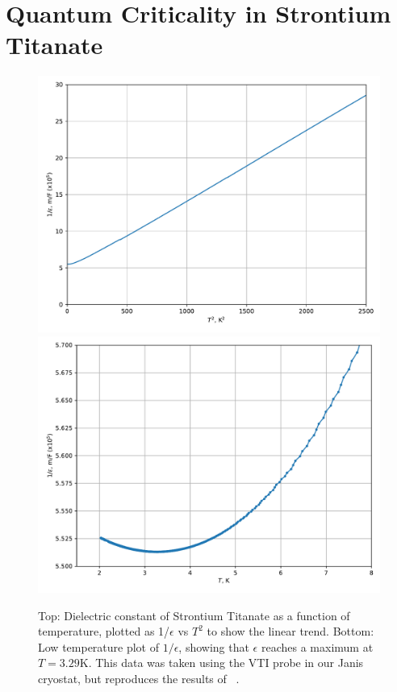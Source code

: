 \documentclass{thesis-umich}
\begin{document}
\section{Quantum Criticality in Strontium Titanate}
\begin{figure}
	\caption[Dielectric constant of Strontium Titanate]{Top: Dielectric constant of Strontium Titanate as a function
		of temperature, plotted as 1/$\epsilon$ vs $T^2$ to show the
		linear trend. Bottom: Low temperature plot of $1/\epsilon$,
		showing that $\epsilon$ reaches a maximum at $T = 3.29$K. This
		data was taken using the VTI probe in our Janis cryostat, but
		reproduces the results of ~\cite{Rowley2014}.}
		\includegraphics[width=0.9\columnwidth]{figures/STO_eps_vs_T.pdf}
		\includegraphics[width=0.9\columnwidth]{figures/STO_eps_vs_T_low.pdf}
		\label{sto_eps_vs_T} \end{figure}
\end{document}
